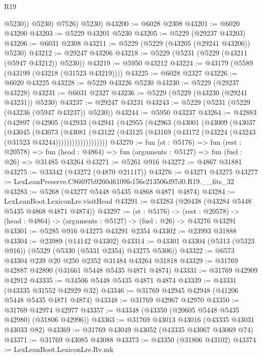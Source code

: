 \begin{lexlean}{R19}
\begin{coremodule}
              @5230))
          @5230)
        @7526)
      @5230)
@43200 := @6028 @2308
@43201 := @6020 @43200
@43203 := @5229 @43201 @5230
@43205 := @5229 (@29237 @43203)
@43206 := @6031 @2308
@43211 := @5229 (@5229 (@43205 (@29241 @43206)) @5230)
@43212 := @29247 @43206
@43218 := @5229 (@5231 (@5229 (@43211 (@5947 @43212)) @5230))
@43219 := @5950 @43212
@43224 := @43179 (@5589 (@43199 (@43218 (@31523 @43219))))
@43225 := @6028 @2327
@43226 := @6020 @43225
@43228 := @5229 @43226 @5230
@43230 := @5229 (@29237 @43228)
@43231 := @6031 @2327
@43236 := @5229 (@5229 (@43230 (@29241 @43231)) @5230)
@43237 := @29247 @43231
@43243 := @5229 (@5231 (@5229 (@43236 (@5947 @43237)) @5230))
@43244 := @5950 @43237
@43264 := @42883
    (@42897
      (@42905
        (@42933
          (@42941
            (@42955
              (@42963
                (@43001
                  (@43009
                    (@43037
                      (@43045
                        (@43073
                          (@43081
                            (@43122
                              (@43125
                                (@43169 (@43172 (@43224 (@43243 (@31523 @43244)))))))))))))))))))
@43270 := fun (st : @5176) =>
  fun (rest : @20578) =>
  fun (head : @4864) => fun (arguments : @5127) => fun (fuel : @26) => @31485 @43264
@43271 := @5261 @916
@43272 := @4867 @31881
@43275 := @33342 (@43272 (@4870 @21117))
@43276 := @43271 @43275
@43277 := LexLeanPreserve.C86697b9260d6109fe156e213506d97d0.R19.__fits_32
@43283 := @5268 (@43277 @5448 @5435 @4868 @4871 @4874)
@43284 := LexLeanBoot.LexiconLre.visitHead
@43291 := @43283 (@20438 (@43284 @5448 @5435 @4868 @4871 @4874))
@43297 := (st : @5176) ->
  (rest : @20578) -> (head : @4864) -> (arguments : @5127) -> (fuel : @26) -> @43276 @43291
@43301 := @5285 @916 @43275 @43291 @2354
@43302 := @23993 @31888
@43304 := @23989 (@14142 @43302)
@43314 := @43301 @43304 (@5313 (@5323 @916)) (@5329 (@5330 (@5331 @2354) @43275 @5306))
@43322 := @6573 @43304 @239 @20 @250 @2352 @31484 @43264 @31818
@43329 := @31769 @42887 @42890 (@31661 @5448 @5435 @4871 @4874)
@43331 := @31769 @42909 @42912
@43335 := @34506 @5448 @5435 @4871 @4874
@43339 := @43331 (@43335 @31552 @42929 @32)
@43346 := @31769 @42945 @42948 (@41206 @5448 @5435 @4871 @4874)
@43348 := @31769 @42967 @42970
@43350 := @31769 @42974 @42977
@43357 := @43348 (@43350 (@20605 @5448 @5435 @42980) (@31806 @42996))
@43363 := @31769 @43013 @43016 (@43335 @43031 @43033 @82)
@43369 := @31769 @43049 @43052 (@43335 @43067 @43069 @74)
@43371 := @31769 @43085 @43088
@43373 := @43350 (@31806 @43102)
@43374 := LexLeanBoot.LexiconLre.Rv.mk

\end{coremodule}
\end{lexlean}
